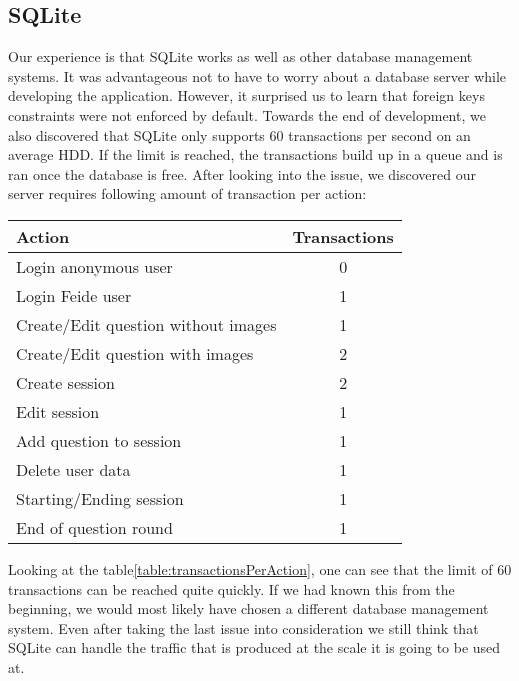 \subsection{SQLite}
Our experience is that SQLite works as well as other database management systems. It was advantageous not to have to worry about a database server while developing the application. However, it surprised us to learn that foreign keys constraints were not enforced by default. Towards the end of development, we also discovered that SQLite only supports 60 transactions per second on an average HDD. If the limit is reached, the transactions build up in a queue and is ran once the database is free. After looking into the issue, we discovered our server requires following amount of transaction per action:
\begin{center}
    \begin{tabular}{|l|c|}
        \hline
        Action & Transactions \\
        \hline
        Login anonymous user & 0 \\
        \hline
        Login Feide user & 1 \\
        \hline
        Create/Edit question without images & 1 \\
        \hline
        Create/Edit question with images & 2 \\
        \hline
        Create session & 2 \\
        \hline
        Edit session & 1 \\
        \hline
        Add question to session & 1 \\
        \hline
        Delete user data & 1 \\
        \hline
        Starting/Ending session & 1 \\
        \hline
        End of question round & 1 \\
        \hline
    \end{tabular}
    \label{table:transactionsPerAction}
\end{center}
\noindent
Looking at the table\ref{table:transactionsPerAction}, one can see that the limit of 60 transactions can be reached quite quickly. If we had known this from the beginning, we would most likely have chosen a different database management system. Even after taking the last issue into consideration we still think that SQLite can handle the traffic that is produced at the scale it is going to be used at. 
